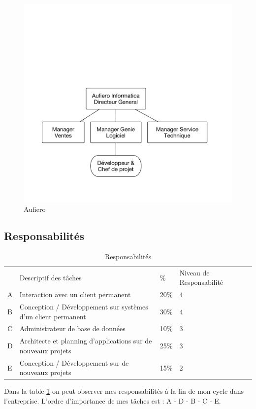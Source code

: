 \documentclass{resume} %
\begin{document}
 \begin{figure}[!htp]
 \begin{center}
 \includegraphics[width=0.60\linewidth]{aufiero.pdf}
 \caption{Aufiero}
 \end{center}
 \end{figure}
		
	\subsection{Responsabilités}

\newcommand{\uno}{\ding{172}\ }
\newcommand{\dos}{\ding{173}\ }
\newcommand{\tres}{\ding{174}\ }
\newcommand{\cuatro}{\ding{175}\ }

\newcommand{\UNO}{\ding{202}\ }
\newcommand{\DOS}{\ding{203}\ }
\newcommand{\TRES}{\ding{204}\ }
\newcommand{\CUATRO}{\ding{205}\ }


\begin{table}[!htbp]
\label{table-aufiero}
\begin{tabular}{|l|l|l|l|l}
\cline{1-4}
   & Descriptif des tâches &  \% & Niveau de Responsabilité \footnotemark &  \\ \cline{1-4}
 A& Interaction avec un client permanent & 20\% & 4 &  \\ \cline{1-4}
 B& Conception / Développement sur systèmes d'un client permanent & 30\%& 4&  \\ \cline{1-4}
 C& Administrateur de base de données  & 10\%  & 3 &  \\ \cline{1-4}
 D& Architecte et planning d'applications sur de nouveaux projets & 25\% & 3 &  \\ \cline{1-4}
 E& Conception / Développement sur de nouveaux projets & 15\% &2&  \\ \cline{1-4}
\end{tabular}

\caption{Responsabilités}
\end{table}
Dans la table \ref{table-aufiero} on peut observer mes responsabilités  \`a la fin de mon cycle dans l'entreprise.
L'ordre d'importance de mes tâches est : A - D - B - C - E. 
\end{document}
